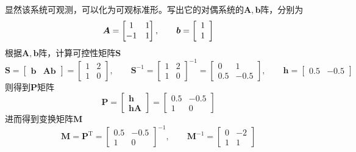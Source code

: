 \solve 显然该系统可观测，可以化为可观标准形。写出它的对偶系统的$\bm{A,b}$阵，分别为
\begin{equation*}
	\bm{A} = 
	\begin{bmatrix}
		1 & 1\\
		-1 & 1
	\end{bmatrix}, 
	\qquad
	\bm{b} =
	\begin{bmatrix}
		1\\
		\hspace*{0.5em} 1 \hspace*{0.5em}
	\end{bmatrix}
\end{equation*}
根据$\bm{A,b}$阵，计算可控性矩阵$\bm{S}$
\begin{equation*}
	\bm{S} = 
	\begin{bmatrix}
		\bm{b} & \bm{Ab}
	\end{bmatrix}
	=
	\begin{bmatrix}
		1 & 2\\
		1 & 0
	\end{bmatrix},
	\qquad 
	\bm{S}^{-1} =
	\begin{bmatrix}
		1 & 2\\
		1 & 0
	\end{bmatrix}^{-1}
	=
	\begin{bmatrix}
		0 & 1\\
		0.5 & -0.5
	\end{bmatrix},
	\qquad 
	\bm{h} =
	\begin{bmatrix}
		0.5 & -0.5
	\end{bmatrix}
\end{equation*}
则得到$\bm{P}$矩阵
\begin{equation*}
	\bm{P} = 
	\begin{bmatrix}
		\bm{h}\\
		\bm{hA}
	\end{bmatrix}
	=
	\begin{bmatrix}
		0.5 & -0.5\\
		1 & 0
	\end{bmatrix}
\end{equation*}
进而得到变换矩阵$\bm{M}$
\begin{equation*}
	\bm{M} = \bm{P}^{\text{T}} =
	\begin{bmatrix}
		0.5 & -0.5\\
		1 & 0
	\end{bmatrix}^{-1},
	\qquad \bm{M}^{-1} =
	\begin{bmatrix}
		0 & -2\\
		1 & 1
	\end{bmatrix}
\end{equation*}
